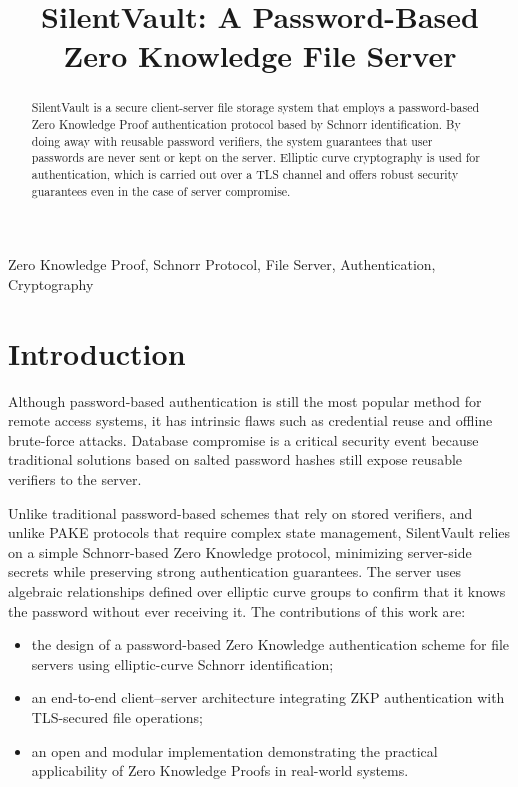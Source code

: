 \documentclass[conference]{IEEEtran}
\begin{document}
\title{SilentVault: A Password-Based Zero Knowledge File Server}

\author{
}

\maketitle

\begin{abstract}
SilentVault is a secure client-server file storage system that employs a password-based Zero Knowledge Proof authentication protocol based by Schnorr identification. By doing away with reusable password verifiers, the system guarantees that user passwords are never sent or kept on the server.
Elliptic curve cryptography is used for authentication, which is carried out over a TLS channel and offers robust security guarantees even in the case of server compromise.
\end{abstract}

\begin{IEEEkeywords}
Zero Knowledge Proof, Schnorr Protocol, File Server, Authentication, Cryptography
\end{IEEEkeywords}

\section{Introduction}

Although password-based authentication is still the most popular method for remote access systems, it has intrinsic flaws such as credential reuse and offline brute-force attacks. Database compromise is a critical security event because traditional solutions based on salted password hashes still expose reusable verifiers to the server.

Unlike traditional password-based schemes that rely on stored verifiers, and unlike PAKE protocols that require complex state management, SilentVault relies on a simple Schnorr-based Zero Knowledge protocol, minimizing server-side secrets while preserving strong authentication guarantees. The server uses algebraic relationships defined over elliptic curve groups to confirm that it knows the password without ever receiving it. The contributions of this work are:
\begin{itemize}
    \item the design of a password-based Zero Knowledge authentication scheme for file servers using elliptic-curve Schnorr identification;
    \item an end-to-end client--server architecture integrating ZKP authentication with TLS-secured file operations;
    \item an open and modular implementation demonstrating the practical applicability of Zero Knowledge Proofs in real-world systems.
\end{itemize}
\end{document}
